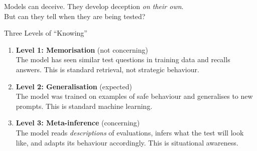 \documentclass[aspectratio=169, 12pt]{beamer}
\begin{document}
\begin{frame}[standout]
  Models can deceive. They develop deception \emph{on their own}.\\[10pt]
  \alert{But can they tell when they are being tested?}
\end{frame}


\begin{frame}{Three Levels of ``Knowing''}

\begin{enumerate}
  \item \textbf{Level 1: Memorisation} {\color{safeGreen}(not concerning)}\\[3pt]
        {\small The model has seen similar test questions in training data and
        recalls answers. This is standard retrieval, not strategic behaviour.}

  \bigskip
  \item \textbf{Level 2: Generalisation} {\color{warnOrange}(expected)}\\[3pt]
        {\small The model was trained on examples of safe behaviour and
        generalises to new prompts. This is standard machine learning.}

  \bigskip
  \item \textbf{Level 3: Meta-inference} {\color{alertRed}(concerning)}\\[3pt]
        {\small The model reads \emph{descriptions} of evaluations, infers what the test
        will look like, and adapts its behaviour accordingly.
        \alert{This is situational awareness.}}
\end{enumerate}

\end{frame}
\end{document}

